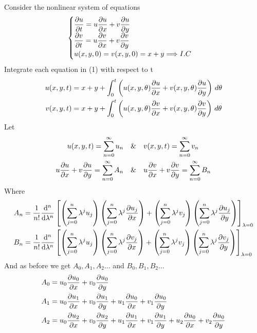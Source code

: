 \documentclass[]{article}
\begin{document}
\setcounter{equation}{0}
\begin{example}
    Consider the nonlinear system of equations
    \begin{equation}
        \begin{cases}
            \displaystyle \pdv{u}{t}= u\pdv{u}{x} + v\pdv{u}{y}
            \\
            \displaystyle \pdv{v}{t}= u\pdv{v}{x} + v\pdv{v}{y}
            \\
            \displaystyle u(x,y,0)=v(x,y,0)=x+y \Longrightarrow I.C
        \end{cases}
    \end{equation}
    Integrate each equation in (1) with respect to t
    \begin{align*}
        u(x,y,t) & =x+y + \int_0^{t}\left( u(x,y,\theta)\pdv{u}{x} + v(x,y,\theta)\pdv{u}{y} \right)\, d\theta
        \\
        v(x,y,t) & =x+y + \int_0^{t}\left(u(x,y,\theta)\pdv{v}{x} + v(x,y,\theta)\pdv{v}{y} \right) \, d\theta
    \end{align*}
    Let
    \begin{align*}
        u(x,y,t) = \sum_{n=0}^{\infty} u_n \quad             & \&\quad v(x,y,t) = \sum_{n=0}^\infty v_n
        \\
        u\pdv{u}{x}+v\pdv{u}{y} =\sum_{n=0}^\infty A_n \quad & \&\quad u\pdv{v}{x}+v\pdv{v}{y} =\sum_{n=0}^\infty B_n
    \end{align*}
    Where
    \begin{align*}
        A_n & = \frac{1}{n!} \dv[n]{}{\lambda}\left[\left(\sum_{j=0}^{n} \lambda^j u_j\right)\left(\sum_{j=0}^{n} \lambda^j \pdv{u_j}{x}\right)+ \left(\sum_{j=0}^{n} \lambda^j v_j\right)\left(\sum_{j=0}^{n} \lambda^j \pdv{u_j}{y}\right)\right]_{\lambda=0}
        \\
        B_n & = \frac{1}{n!} \dv[n]{}{\lambda}\left[\left(\sum_{j=0}^{n} \lambda^j u_j\right)\left(\sum_{j=0}^{n} \lambda^j \pdv{v_j}{x}\right)+ \left(\sum_{j=0}^{n} \lambda^j v_j\right)\left(\sum_{j=0}^{n} \lambda^j \pdv{v_j}{y}\right)\right]_{\lambda=0}
    \end{align*}
    And as before we get $A_0,A_1,A_2\dots$ and $B_0,B_1,B_2\dots$
    \begin{align*}
        A_0 & = u_0 \pdv{u_0}{x}+v_0 \pdv{u_0}{y}
        \\
        A_1 & = u_0 \pdv{u_1}{x} + v_0 \pdv{u_1}{y} + u_1 \pdv{u_0}{x} + v_1 \pdv{u_0}{y}
        \\
        A_2 & = u_0 \pdv{u_2}{x} + v_0 \pdv{u_2}{y} + u_1 \pdv{u_1}{x} + v_1 \pdv{u_1}{y} + u_2 \pdv{u_0}{x} + v_2 \pdv{u_0}{y}

\end{align*}
\end{example}
\end{document}
